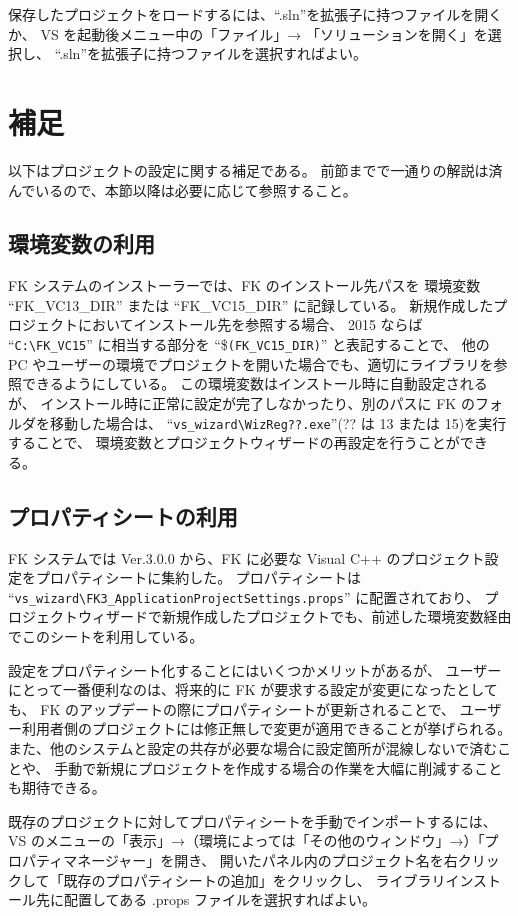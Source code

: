 \documentclass[a4j]{jarticle}
\begin{document}
保存したプロジェクトをロードするには、``.sln''を拡張子に持つファイルを開くか、
VS を起動後メニュー中の「ファイル」→ 「ソリューションを開く」を選択し、
``.sln''を拡張子に持つファイルを選択すればよい。

\appendix

\section{補足}
以下はプロジェクトの設定に関する補足である。
前節までで一通りの解説は済んでいるので、本節以降は必要に応じて参照すること。

\subsection{環境変数の利用}
FK システムのインストーラーでは、FK のインストール先パスを
環境変数 ``FK\_VC13\_DIR'' または ``FK\_VC15\_DIR'' に記録している。
新規作成したプロジェクトにおいてインストール先を参照する場合、
2015 ならば ``\verb+C:\FK_VC15+'' に相当する部分を ``\$\verb+(FK_VC15_DIR)+'' と表記することで、
他の PC やユーザーの環境でプロジェクトを開いた場合でも、適切にライブラリを参照できるようにしている。
この環境変数はインストール時に自動設定されるが、
インストール時に正常に設定が完了しなかったり、別のパスに FK のフォルダを移動した場合は、
``\verb+vs_wizard\WizReg??.exe+''(?? は 13 または 15)を実行することで、
環境変数とプロジェクトウィザードの再設定を行うことができる。


\subsection{プロパティシートの利用}
FK システムでは Ver.3.0.0 から、FK に必要な Visual C++ のプロジェクト設定をプロパティシートに集約した。
プロパティシートは ``\verb+vs_wizard\FK3_ApplicationProjectSettings.props+'' に配置されており、
プロジェクトウィザードで新規作成したプロジェクトでも、前述した環境変数経由でこのシートを利用している。

設定をプロパティシート化することにはいくつかメリットがあるが、
ユーザーにとって一番便利なのは、将来的に FK が要求する設定が変更になったとしても、
FK のアップデートの際にプロパティシートが更新されることで、
ユーザー利用者側のプロジェクトには修正無しで変更が適用できることが挙げられる。
また、他のシステムと設定の共存が必要な場合に設定箇所が混線しないで済むことや、
手動で新規にプロジェクトを作成する場合の作業を大幅に削減することも期待できる。

既存のプロジェクトに対してプロパティシートを手動でインポートするには、
VS のメニューの「表示」→（環境によっては「その他のウィンドウ」→）「プロパティマネージャー」を開き、
開いたパネル内のプロジェクト名を右クリックして「既存のプロパティシートの追加」をクリックし、
ライブラリインストール先に配置してある .props ファイルを選択すればよい。
\end{document}
